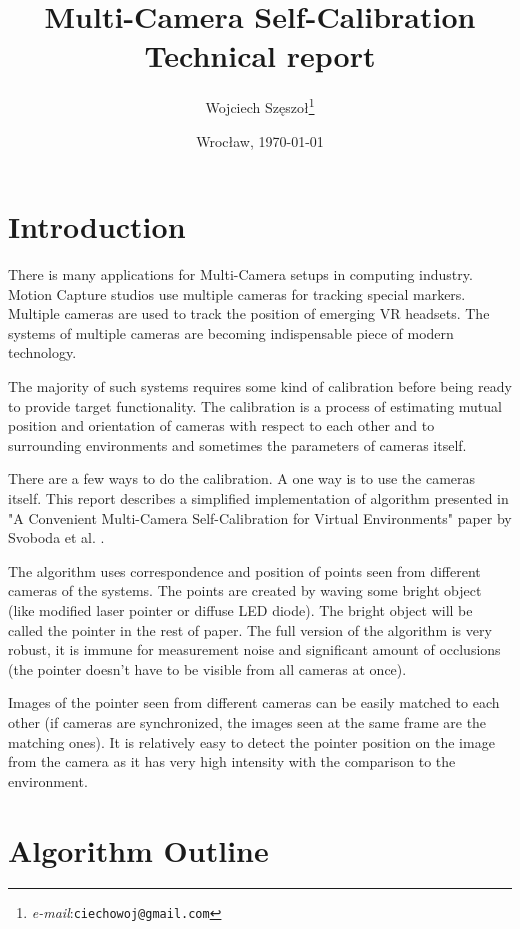 \documentclass[12pt]{article}
\title{\textbf{Multi-Camera Self-Calibration}\\{\large Technical report}}
\author{Wojciech Szęszoł\thanks{\textit{e-mail}:\texttt{ciechowoj@gmail.com}}}
\date{Wrocław, \today}
\begin{document}
\maketitle


\thispagestyle{empty}
\newpage

\section{Introduction}

There is many applications for Multi-Camera setups in computing industry. Motion
Capture studios use multiple cameras for tracking special markers. Multiple
cameras are used to track the position of emerging VR headsets. The systems of
multiple cameras are becoming indispensable piece of modern technology.

The majority of such systems requires some kind of calibration before being
ready to provide target functionality. The calibration is a process of
estimating mutual position and orientation of cameras with respect to each other
and to surrounding environments and sometimes the parameters of cameras itself.

There are a few ways to do the calibration. A one way is to use the cameras
itself. This report  describes a simplified implementation of algorithm
presented in "A Convenient Multi-Camera  Self-Calibration for Virtual
Environments" paper by Svoboda et al. \cite{svoboda05}.

The algorithm uses correspondence and position of points seen from different
cameras of the systems. The points are created by waving some bright object
(like modified laser pointer or diffuse LED diode). The bright object will be
called the pointer in the rest of paper. The full  version of the algorithm is
very robust, it is immune for measurement noise and significant  amount of
occlusions (the pointer doesn't have to be visible from all cameras at once).

Images of the pointer seen from different cameras can be easily matched to each
other (if cameras are synchronized, the images seen at the same frame are the
matching ones). It is relatively easy to detect the pointer position on the
image from the camera as it has very high  intensity with  the comparison to the
environment.

\section{Algorithm Outline}
\end{document}
